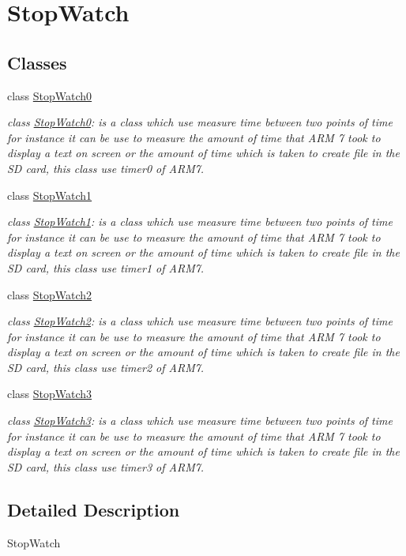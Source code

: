 \hypertarget{group__group2}{
\section{StopWatch}
\label{group__group2}
}
\subsection*{Classes}
\begin{DoxyCompactItemize}
\item 
class \hyperlink{class_stop_watch0}{StopWatch0}
\begin{DoxyCompactList}\small\item\em class \hyperlink{class_stop_watch0}{StopWatch0}: is a class which use measure time between two points of time for instance it can be use to measure the amount of time that ARM 7 took to display a text on screen or the amount of time which is taken to create file in the SD card, this class use timer0 of ARM7. \end{DoxyCompactList}\item 
class \hyperlink{class_stop_watch1}{StopWatch1}
\begin{DoxyCompactList}\small\item\em class \hyperlink{class_stop_watch1}{StopWatch1}: is a class which use measure time between two points of time for instance it can be use to measure the amount of time that ARM 7 took to display a text on screen or the amount of time which is taken to create file in the SD card, this class use timer1 of ARM7. \end{DoxyCompactList}\item 
class \hyperlink{class_stop_watch2}{StopWatch2}
\begin{DoxyCompactList}\small\item\em class \hyperlink{class_stop_watch2}{StopWatch2}: is a class which use measure time between two points of time for instance it can be use to measure the amount of time that ARM 7 took to display a text on screen or the amount of time which is taken to create file in the SD card, this class use timer2 of ARM7. \end{DoxyCompactList}\item 
class \hyperlink{class_stop_watch3}{StopWatch3}
\begin{DoxyCompactList}\small\item\em class \hyperlink{class_stop_watch3}{StopWatch3}: is a class which use measure time between two points of time for instance it can be use to measure the amount of time that ARM 7 took to display a text on screen or the amount of time which is taken to create file in the SD card, this class use timer3 of ARM7. \end{DoxyCompactList}\end{DoxyCompactItemize}


\subsection{Detailed Description}
StopWatch 